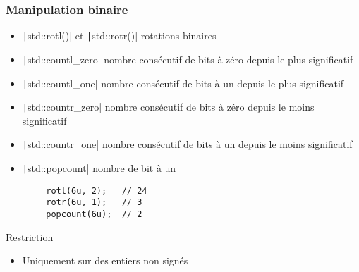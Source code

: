 \documentclass[C++.tex]{subfiles}
\begin{document}
\begin{frame}[fragile]
	\frametitle{Manipulation binaire}
	\begin{itemize}
		\item \texttt|std::rotl()| et \texttt|std::rotr()| rotations binaires
		\item \texttt|std::countl_zero| nombre consécutif de bits à zéro depuis le plus significatif
		\item \texttt|std::countl_one| nombre consécutif de bits à un depuis le plus significatif
		\item \texttt|std::countr_zero| nombre consécutif de bits à zéro depuis le moins significatif
		\item \texttt|std::countr_one| nombre consécutif de bits à un depuis le moins significatif
		\item \texttt|std::popcount| nombre de bit à un
	\end{itemize}

	\begin{verbatim}
		rotl(6u, 2);   // 24
		rotr(6u, 1);   // 3
		popcount(6u);  // 2
	\end{verbatim}

	\begin{alertblock}{Restriction}
		\begin{itemize}
			\item Uniquement sur des entiers non signés
		\end{itemize}
	\end{alertblock}


\end{frame}
\end{document}

